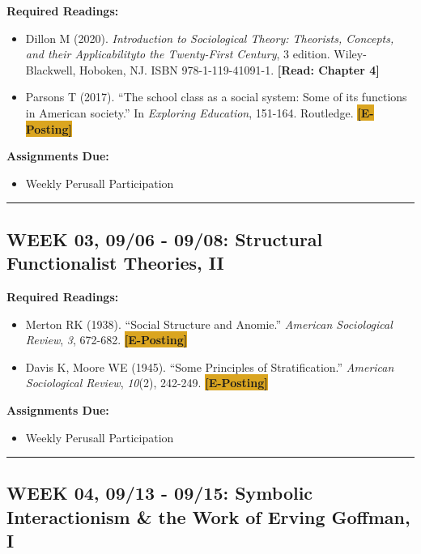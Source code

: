 \documentclass[11pt,]{article}
\providecommand{\tightlist}{%
  \setlength{\itemsep}{0pt}\setlength{\parskip}{0pt}}
\begin{document}
\textbf{Required Readings:}

\begin{itemize}
\item
  Dillon M (2020). \emph{Introduction to Sociological Theory: Theorists,
  Concepts, and their Applicabilityto the Twenty-First Century}, 3
  edition. Wiley-Blackwell, Hoboken, NJ. ISBN 978-1-119-41091-1.
  \textcolor{BrickRed}{\bf{[Read: Chapter 4]}}
\item
  Parsons T (2017). ``The school class as a social system: Some of its
  functions in American society.'' In \emph{Exploring Education},
  151-164. Routledge. \colorbox{Goldenrod}{\bf{[E-Posting]}}
\end{itemize}

\textbf{Assignments Due:}

\begin{itemize}
\tightlist
\item
  Weekly Perusall Participation
\end{itemize}

\bigbreak
\hrule

\hypertarget{week-03-0906---0908-structural-functionalist-theories-ii}{%
\subsection{WEEK 03, 09/06 - 09/08: Structural Functionalist Theories,
II}\label{week-03-0906---0908-structural-functionalist-theories-ii}}

\textbf{Required Readings:}

\begin{itemize}
\item
  Merton RK (1938). ``Social Structure and Anomie.'' \emph{American
  Sociological Review}, \emph{3}, 672-682.
  \colorbox{Goldenrod}{\bf{[E-Posting]}}
\item
  Davis K, Moore WE (1945). ``Some Principles of Stratification.''
  \emph{American Sociological Review}, \emph{10}(2), 242-249.
  \colorbox{Goldenrod}{\bf{[E-Posting]}}
\end{itemize}

\textbf{Assignments Due:}

\begin{itemize}
\tightlist
\item
  Weekly Perusall Participation
\end{itemize}

\bigbreak
\hrule

\hypertarget{week-04-0913---0915-symbolic-interactionism-the-work-of-erving-goffman-i}{%
\subsection{WEEK 04, 09/13 - 09/15: Symbolic Interactionism \& the Work
of Erving Goffman,
I}\label{week-04-0913---0915-symbolic-interactionism-the-work-of-erving-goffman-i}}
\end{document}
